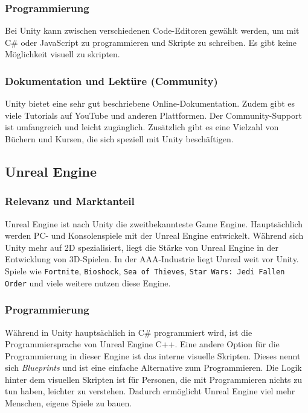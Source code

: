 \subsubsection{Programmierung}
Bei Unity kann zwischen verschiedenen Code-Editoren gewählt werden, um mit C\# oder JavaScript zu programmieren und Skripte zu schreiben. Es gibt keine Möglichkeit visuell zu skripten.

\subsubsection{Dokumentation und Lektüre (Community)}
Unity bietet eine sehr gut beschriebene Online-Dokumentation. Zudem gibt es viele Tutorials auf YouTube und anderen Plattformen. Der Community-Support ist umfangreich und leicht zugänglich. Zusätzlich gibt es eine Vielzahl von Büchern und Kursen, die sich speziell mit Unity beschäftigen.

\pagebreak

\subsection{Unreal Engine}
\subsubsection{Relevanz und Marktanteil}
Unreal Engine ist nach Unity die zweitbekannteste Game Engine. Hauptsächlich werden PC- und Konsolenspiele mit der Unreal Engine entwickelt. Während sich Unity mehr auf 2D spezialisiert, liegt die Stärke von Unreal Engine in der Entwicklung von 3D-Spielen. In der AAA-Industrie liegt Unreal weit vor Unity. Spiele wie \verb+Fortnite+, \verb+Bioshock+, \verb+Sea of Thieves+, \verb+Star Wars: Jedi Fallen Order+ und viele weitere nutzen diese Engine.

\subsubsection{Programmierung}
Während in Unity hauptsächlich in C\# programmiert wird, ist die Programmiersprache von Unreal Engine C++. Eine andere Option für die Programmierung in dieser Engine ist das interne visuelle Skripten. Dieses nennt sich \textit{Blueprints} und ist eine einfache Alternative zum Programmieren. Die Logik hinter dem visuellen Skripten ist für Personen, die mit Programmieren nichts zu tun haben, leichter zu verstehen. Dadurch ermöglicht Unreal Engine viel mehr Menschen, eigene Spiele zu bauen.

